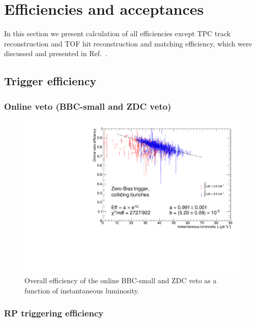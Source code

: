 \section{Efficiencies and acceptances}

In this section we present calculation of all efficiencies except TPC track reconstruction and TOF hit reconstruction and matching efficiency, which were discussed and presented in Ref.~\cite{supplementaryNote}.

\subsection{Trigger efficiency}\label{sec:triggerEff}
\subsubsection{Online veto (BBC-small and ZDC veto)}
\begin{figure}[ht!]
\centering%
\includegraphics[width=0.65\linewidth,page=1]{graphics/corrections/OnlineVetoEffVsInstLumi_graph.pdf}%
\caption{Overall efficiency of the online BBC-small and ZDC veto as a function of instantaneous luminosity.}\label{fig:onlineVetoEff}%
\end{figure}
\subsubsection{RP triggering efficiency}\label{sec:rpTrigEff}


